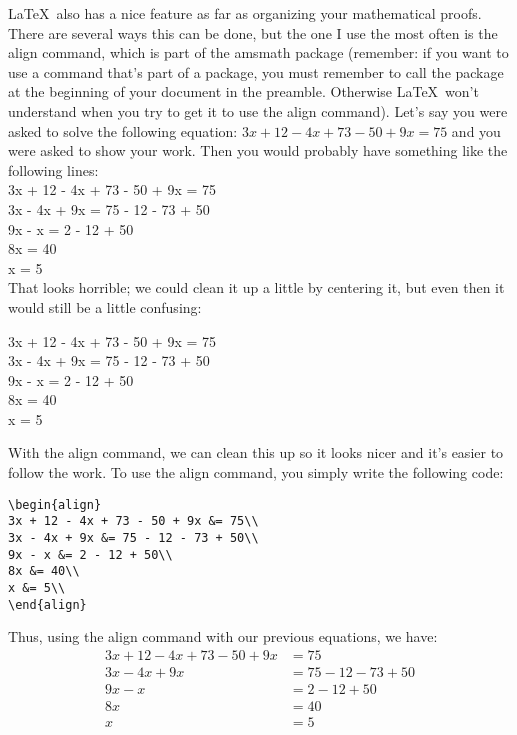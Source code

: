 \documentclass{article}
\begin{document}
\LaTeX~also has a nice feature as far as organizing your mathematical proofs. There are several ways this can be done, but the one I use the most often is the align command, which is part of the amsmath package (remember: if you want to use a command that's part of a package, you must remember to call the package at the beginning of your document in the preamble. Otherwise \LaTeX~won't understand when you try to get it to use the align command). Let's say you were asked to solve the following equation: $3x + 12 - 4x + 73 - 50 + 9x = 75$ and you were asked to show your work. Then you would probably have something like the following lines: \\
3x + 12 - 4x + 73 - 50 + 9x = 75\\
3x - 4x + 9x = 75 - 12 - 73 + 50\\
9x - x = 2 - 12 + 50\\
8x = 40\\
x = 5\\
That looks horrible; we could clean it up a little by centering it, but even then it would still be a little confusing:
\begin{center}
3x + 12 - 4x + 73 - 50 + 9x = 75\\
3x - 4x + 9x = 75 - 12 - 73 + 50\\
9x - x = 2 - 12 + 50\\
8x = 40\\
x = 5\\
\end{center} 
With the align command, we can clean this up so it looks nicer and it's easier to follow the work. To use the align command, you simply write the following code: 
\begin{verbatim}
\begin{align}
3x + 12 - 4x + 73 - 50 + 9x &= 75\\
3x - 4x + 9x &= 75 - 12 - 73 + 50\\
9x - x &= 2 - 12 + 50\\
8x &= 40\\
x &= 5\\
\end{align}
\end{verbatim}
Thus, using the align command with our previous equations, we have: 
\begin{align}
3x + 12 - 4x + 73 - 50 + 9x &= 75\\
3x - 4x + 9x &= 75 - 12 - 73 + 50\\
9x - x &= 2 - 12 + 50\\
8x &= 40\\
x &= 5
\end{align}
\end{document}
